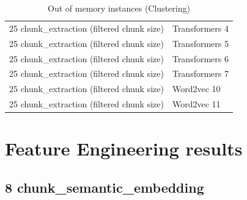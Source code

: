 \begin{table}[H]
\begin{tabular}{ll}
25 chunk\_extraction (filtered chunk size) & Transformers 4 \\ 
25 chunk\_extraction (filtered chunk size) & Transformers 5 \\ 
25 chunk\_extraction (filtered chunk size) & Transformers 6 \\ 
25 chunk\_extraction (filtered chunk size) & Transformers 7 \\ 
25 chunk\_extraction (filtered chunk size) & Word2vec 10 \\ 
25 chunk\_extraction (filtered chunk size) & Word2vec 11 \\ 
\hline
\end{tabular}
\caption{Out of memory instances (Clustering)}
\label{tab:annexe:out_of_memory_instances_clustering}
\end{table}

\section{Feature Engineering results}

\label{sec:annexe:feature_engineering_results}

\subsection{8 chunk\_semantic\_embedding}

